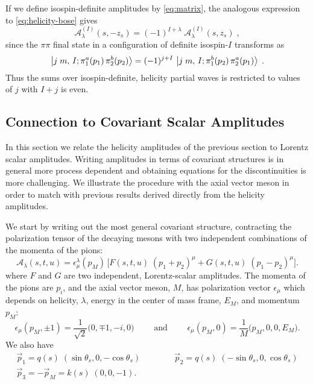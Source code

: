 If we define isospin-definite amplitudes by \cref{eq:matrix}, the analogous expression to \cref{eq:helicity-bose} gives
  \begin{equation}
    \label{eq:helicity-iso-bose}
      \mathcal{A}^{(I)}_{\lambda}(s,-z_s) = (-1)^{I + \lambda} \; \mathcal{A}^{(I)}_{\lambda}(s, z_s) \;,
  \end{equation}
since the \(\pi\pi\) final state in a configuration of definite isospin-\(I\) transforms as
  \begin{equation}
    \label{eq:pipi-iso-bose}
    \ket{j \; m, \, I ;  \pi^a_1(p_1) \, \pi^b_2(p_2)} = (-1)^{j+I} \, \ket{j \; m, \, I; \pi^b_1(p_2) \, \pi^a_2(p_1)}
    \; .
  \end{equation}
Thus the sums over isospin-definite, helicity partial waves is restricted to values of \(j\) with \(I + j\) is even.
 \subsection{Connection to Covariant Scalar Amplitudes} \label{sec:covariant}
 In this section we relate the helicity amplitudes of the previous section to Lorentz scalar amplitudes. Writing amplitudes in terms of covariant structures is in general more process dependent and obtaining equations for the discontinuities is more challenging. We illustrate the procedure with the axial vector meson in order to match with previous results derived directly from the helicity amplitudes.

   We start by writing out the most general covariant structure, contracting the polarization tensor of the decaying mesons with two independent combinations of the momenta of the pions:
   \begin{equation}
     \label{eq:covariant}
     \mathcal{A}_\lambda(s,t,u) = \epsilon_\mu^\lambda(p_M) \, \bigg[ F(s,t,u) \; (p_1 + p_2)^\mu + G(s,t,u) \;  (p_1 - p_2)^\mu \bigg].
     \end{equation}
 where \(F\) and \(G\) are two independent, Lorentz-scalar amplitudes. The momenta of the pions are \(p_i\), and the axial vector meson, \(M\), has polarization vector \(\epsilon_\mu\) which depends on helicity, \(\lambda\), energy in the center of mass frame, \(E_M\), and momentum \(p_M\):
   \begin{equation}
     \label{eq:polarization}
     \epsilon_\mu(p_M, \pm1) = \frac{1}{\sqrt{2}} \big( 0, \mp 1, - i, 0 \big) \qquad \text{ and } \qquad \epsilon_\mu(p_M, 0) = \frac{1}{M} \big( p_M, 0, 0, E_M \big).
     \end{equation}
 We also have
   \begin{gather}
     \vec{p}_1 = q(s) \; (\sin \theta_s, 0,  -\cos \theta_s) \qquad \qquad \vec{p}_2 = q(s) \; (-\sin \theta_s, 0 , \cos \theta_s ) \\
     \vec{p}_3 = - \vec{p}_M = k(s) \; (0,0,-1). \nonumber
   \end{gather}

